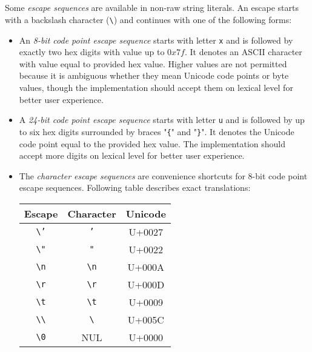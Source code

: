 \begin{bnf}
   \eq {} \gor {} \gor {} \gor {} \gor {} \gor \term{\textbackslash \textbackslash} \gor {} \\
   \eq {} \  \  \\
   \eq {} \  \ \term{\}} \\
  \\
   \eq {} \gor {} \gor {}
\end{bnf}

Some \emph{escape sequences} are available in non-raw string literals. An escape starts with a backslash character (\texttt{\textbackslash}) and continues with one of the following forms:

\begin{itemize}
  \item An \emph{8-bit code point escape sequence} starts with letter \texttt{x} and is followed by exactly two hex digits with value up to \(0x7f\). It denotes an ASCII character with value equal to provided hex value. Higher values are not permitted because it is ambiguous whether they mean Unicode code points or byte values, though the implementation should accept them on lexical level for better user experience.
  \item A \emph{24-bit code point escape sequence} starts with letter \texttt{u} and is followed by up to six hex digits surrounded by braces "\texttt{\{}" and "\texttt{\}}". It denotes the Unicode code point equal to the provided hex value. The implementation should accept more digits on lexical level for better user experience.
  \item The \emph{character escape sequences} are convenience shortcuts for 8-bit code point escape sequences. Following table describes exact translations:

    \begin{center}
    \begin{tabular}{c|c|c}
      Escape & Character & Unicode \\
      \hline
      \texttt{\textbackslash '} & \texttt{'} & U+0027 \\
      \texttt{\textbackslash "} & \texttt{"} & U+0022 \\
      \texttt{\textbackslash n} & \texttt{\textbackslash n} & U+000A \\
      \texttt{\textbackslash r} & \texttt{\textbackslash r} & U+000D \\
      \texttt{\textbackslash t} & \texttt{\textbackslash t} & U+0009 \\
      \texttt{\textbackslash \textbackslash} & \texttt{\textbackslash} & U+005C \\
      \texttt{\textbackslash 0} & NUL & U+0000 \\
    \end{tabular}
    \end{center}
\end{itemize}
